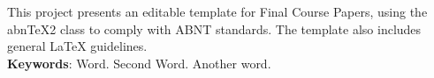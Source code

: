 
\begin{resumo}[ABSTRACT]

    \begin{SingleSpacing}
    
        This project presents an editable template for Final Course Papers, using the abn\TeX{}2 class to comply with ABNT standards. The template also includes general \LaTeX{} guidelines. \\
        
        \textbf{Keywords}: Word. Second Word. Another word.
    
    \end{SingleSpacing}
    
\end{resumo}
